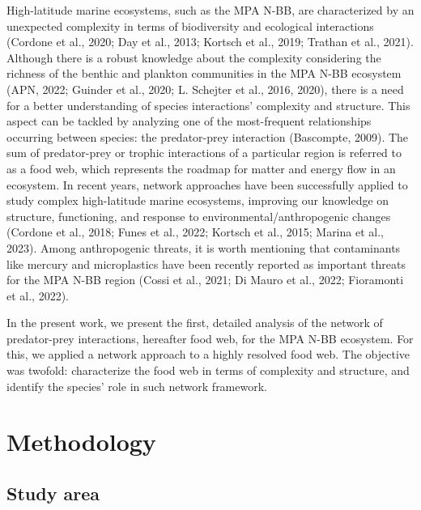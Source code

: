 \documentclass[preprint, 3p,
authoryear]{elsarticle} %
\begin{document}
High-latitude marine ecosystems, such as the MPA N-BB, are characterized
by an unexpected complexity in terms of biodiversity and ecological
interactions (Cordone et al., 2020; Day et al., 2013; Kortsch et al.,
2019; Trathan et al., 2021). Although there is a robust knowledge about
the complexity considering the richness of the benthic and plankton
communities in the MPA N-BB ecosystem (APN, 2022; Guinder et al., 2020;
L. Schejter et al., 2016, 2020), there is a need for a better
understanding of species interactions' complexity and structure. This
aspect can be tackled by analyzing one of the most-frequent
relationships occurring between species: the predator-prey interaction
(Bascompte, 2009). The sum of predator-prey or trophic interactions of a
particular region is referred to as a food web, which represents the
roadmap for matter and energy flow in an ecosystem. In recent years,
network approaches have been successfully applied to study complex
high-latitude marine ecosystems, improving our knowledge on structure,
functioning, and response to environmental/anthropogenic changes
(Cordone et al., 2018; Funes et al., 2022; Kortsch et al., 2015; Marina
et al., 2023). Among anthropogenic threats, it is worth mentioning that
contaminants like mercury and microplastics have been recently reported
as important threats for the MPA N-BB region (Cossi et al., 2021; Di
Mauro et al., 2022; Fioramonti et al., 2022).

In the present work, we present the first, detailed analysis of the
network of predator-prey interactions, hereafter food web, for the MPA
N-BB ecosystem. For this, we applied a network approach to a highly
resolved food web. The objective was twofold: characterize the food web
in terms of complexity and structure, and identify the species' role in
such network framework.

\hypertarget{methodology}{%
\section{Methodology}\label{methodology}}

\hypertarget{study-area}{%
\subsection{Study area}\label{study-area}}
\end{document}

